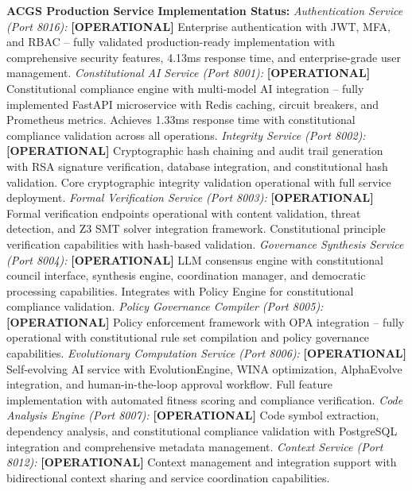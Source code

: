\documentclass[manuscript,screen,9pt]{acmart}
\begin{document}
\textbf{ACGS Production Service Implementation Status:}
\textit{Authentication Service (Port 8016):} \textbf{[OPERATIONAL]} Enterprise authentication with JWT, MFA, and RBAC -- fully validated production-ready implementation with comprehensive security features, 4.13ms response time, and enterprise-grade user management.
\textit{Constitutional AI Service (Port 8001):} \textbf{[OPERATIONAL]} Constitutional compliance engine with multi-model AI integration -- fully implemented FastAPI microservice with Redis caching, circuit breakers, and Prometheus metrics. Achieves 1.33ms response time with constitutional compliance validation across all operations.
\textit{Integrity Service (Port 8002):} \textbf{[OPERATIONAL]} Cryptographic hash chaining and audit trail generation with RSA signature verification, database integration, and constitutional hash validation. Core cryptographic integrity validation operational with full service deployment.
\textit{Formal Verification Service (Port 8003):} \textbf{[OPERATIONAL]} Formal verification endpoints operational with content validation, threat detection, and Z3 SMT solver integration framework. Constitutional principle verification capabilities with hash-based validation.
\textit{Governance Synthesis Service (Port 8004):} \textbf{[OPERATIONAL]} LLM consensus engine with constitutional council interface, synthesis engine, coordination manager, and democratic processing capabilities. Integrates with Policy Engine for constitutional compliance validation.
\textit{Policy Governance Compiler (Port 8005):} \textbf{[OPERATIONAL]} Policy enforcement framework with OPA integration -- fully operational with constitutional rule set compilation and policy governance capabilities.
\textit{Evolutionary Computation Service (Port 8006):} \textbf{[OPERATIONAL]} Self-evolving AI service with EvolutionEngine, WINA optimization, AlphaEvolve integration, and human-in-the-loop approval workflow. Full feature implementation with automated fitness scoring and compliance verification.
\textit{Code Analysis Engine (Port 8007):} \textbf{[OPERATIONAL]} Code symbol extraction, dependency analysis, and constitutional compliance validation with PostgreSQL integration and comprehensive metadata management.
\textit{Context Service (Port 8012):} \textbf{[OPERATIONAL]} Context management and integration support with bidirectional context sharing and service coordination capabilities.
\end{document}

